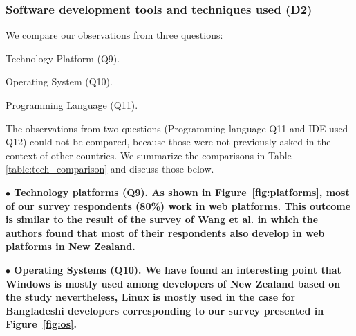 \subsubsection{Software development tools and techniques used (D2)} \label{sec:rq2-d2}

We compare our observations from three questions: \begin{inparaenum}
\item Technology Platform (Q9).
\item Operating System (Q10).
\item Programming Language (Q11).
\end{inparaenum} The observations from two questions (Programming language Q11 and IDE used Q12) could not be compared, because 
those were not previously asked in the context of other countries. We summarize the comparisons in Table \ref{table:tech_comparison} and discuss those below.

% 

\nd\bf{$\bullet$ Technology platforms (Q9).} As shown in
Figure~\ref{fig:platforms}, most of our survey respondents (80\%) work in web
platforms. This outcome is similar to the result of the survey of Wang et al.
\citep{Wang2018} in which the authors found that most of their respondents also
develop in web platforms in New Zealand.


\nd\bf{$\bullet$ Operating Systems (Q10).} We have found an interesting point
that Windows is mostly used among developers of New Zealand based on the study
\citep{Wang2018} nevertheless, Linux is mostly used in the case for Bangladeshi
developers corresponding to our survey presented in Figure~\ref{fig:os}.

